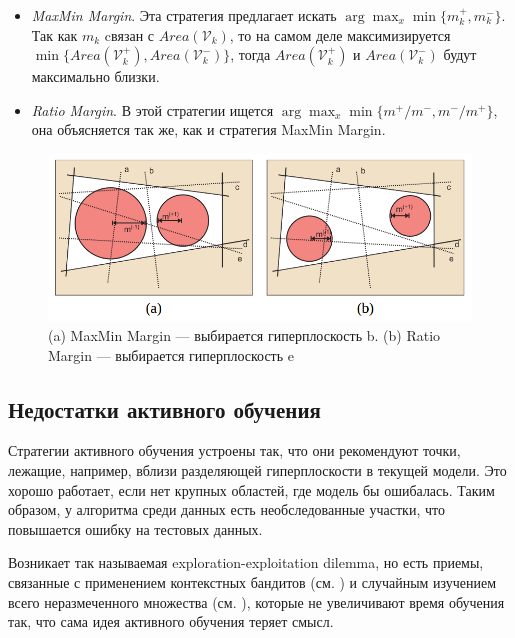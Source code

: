 \documentclass[specialist, 12pt, href]{article}
\begin{document}
\begin{itemize}
\item
  \emph{MaxMin Margin}. Эта стратегия предлагает искать
  \(\arg\max_x \min\{m^+_k, m^-_k\}\). Так как \(m_k\) cвязан с
  \(Area(\mathcal{V}_k)\), то на самом деле максимизируется
  \(\min\{Area(\mathcal{V}_k^+), Area(\mathcal{V}^-_k)\}\), тогда
  \(Area(\mathcal{V}_k^+)\) и \(Area(\mathcal{V}^-_k)\) будут
  максимально близки.
\item
  \emph{Ratio Margin}. В этой стратегии ищется
  \(\arg\max_x \min\{m^+/m^-, m^-/m^+\}\), она объясняется так же, как и
  стратегия MaxMin Margin.
\end{itemize}

\begin{figure}[htbp]
\centering
\includegraphics[width=5in]{img/maxminmargin.png}
\caption{(a) MaxMin Margin --- выбирается гиперплоскость b. (b)
Ratio Margin --- выбирается гиперплоскость e}
\end{figure}

\subsection{Недостатки активного
обучения}

Стратегии активного обучения устроены так, что они рекомендуют точки,
лежащие, например, вблизи разделяющей гиперплоскости в текущей модели.
Это хорошо работает, если нет крупных областей, где модель бы ошибалась.
Таким образом, у алгоритма среди данных есть необследованные участки,
что повышается ошибку на тестовых данных.

Возникает так называемая exploration-exploitation dilemma, но есть
приемы, связанные с применением контекстных бандитов (см. \cite{Bouneffouf1}) и случайным изучением всего неразмеченного множества (см.
\cite{Bouneffouf2}), которые не увеличивают время обучения так, что сама
идея активного обучения теряет смысл.



\end{document}
